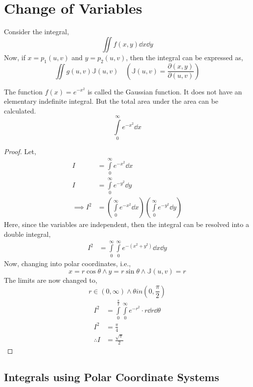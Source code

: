 \section{Change of Variables}
Consider the integral,
\[\iint f(x,y)\dd{x}\dd{y}\]
Now, if $x=p_1(u,v)$ and $y=p_2(u,v)$, then the integral can be expressed as,
\[\iint g(u,v)\mathbb{J}(u,v) \quad \left( \mathbb{J}(u,v)=\frac{\partial(x,y)}{\partial(u,v)} \right)\]
\begin{theorem}
	The function $f(x)=e^{-x^2}$ is called the Gaussian function. It does not have an elementary indefinite integral. But the total area under the area can be calculated.
	\[\int\limits_0^\infty e^{-x^2}\dd{x}\]
\end{theorem}
\begin{proof}
	Let,
	\[\begin{split}
		I&=\int\limits_0^\infty e^{-x^2}\dd{x}\\
		I&=\int\limits_0^\infty e^{-y^2}\dd{y}\\
		\implies I^2&=\left(\int\limits_0^\infty e^{-x^2}\dd{x}\right)\left(\int\limits_0^\infty e^{-y^2}\dd{y}\right)
	\end{split}\]
	Here, since the variables are independent, then the integral can be resolved into a double integral,
	\[\begin{split}
		I^2&=\int\limits_0^\infty\int\limits_0^\infty e^{-(x^2+y^2)}\dd{x}\dd{y}
	\end{split}\]
	Now, changing into polar coordinates, i.e.,
	\[x=r\cos\theta \land y=r\sin\theta \land \mathbb{J}(u,v)=r\]
	The limits are now changed to,
	\[r\in(0,\infty) \land \theta in \left(0,\frac{\pi}{2}\right)\]
	\[\begin{split}
		I^2&=\int\limits_0^\frac{\pi}{2}\int\limits_0^\infty e^{-r^2}\cdot r\dd{r}\dd{\theta}\\
		I^2&=\frac{\pi}{4}\\
		\therefore I&=\frac{\sqrt{\pi}}{2}
	\end{split}\]
\end{proof}
\subsection{Integrals using Polar Coordinate Systems}
